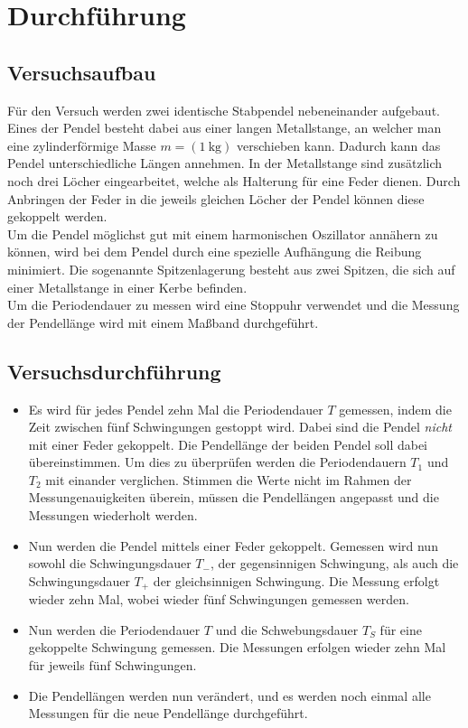 \section{Durchführung}
\label{sec:Durchführung}
\subsection{Versuchsaufbau}
Für den Versuch werden zwei identische Stabpendel nebeneinander aufgebaut. Eines der Pendel besteht dabei aus einer langen Metallstange, an welcher man eine
zylinderförmige Masse $m=(\SI{1}{\kilo\gram})$ verschieben kann. Dadurch kann das Pendel unterschiedliche Längen annehmen. In der Metallstange sind zusätzlich
noch drei Löcher eingearbeitet, welche als Halterung für eine Feder dienen. Durch Anbringen der Feder in die jeweils gleichen Löcher der Pendel können diese
gekoppelt werden.
\\
Um die Pendel möglichst gut mit einem harmonischen Oszillator annähern zu können, wird bei dem Pendel durch eine spezielle Aufhängung die Reibung minimiert. 
Die sogenannte Spitzenlagerung besteht aus zwei Spitzen, die sich auf einer Metallstange in einer Kerbe befinden. 
\\
Um die Periodendauer zu messen wird eine Stoppuhr verwendet und die Messung der Pendellänge wird mit einem Maßband durchgeführt.
\subsection{Versuchsdurchführung}
\begin{itemize}
    \item Es wird für jedes Pendel zehn Mal die Periodendauer $T$ gemessen, indem die Zeit zwischen fünf Schwingungen gestoppt wird. Dabei sind die Pendel 
        \textit{nicht} mit einer Feder gekoppelt. Die Pendellänge der beiden Pendel soll dabei übereinstimmen. Um dies zu überprüfen werden die Periodendauern 
        $T_1$ und $T_2$ mit einander verglichen. Stimmen die Werte nicht im Rahmen der Messungenauigkeiten überein, müssen die Pendellängen angepasst und die 
        Messungen wiederholt werden. 
    \item Nun werden die Pendel mittels einer Feder gekoppelt. Gemessen wird nun sowohl die Schwingungsdauer $T_-$, der gegensinnigen Schwingung, als auch die 
        Schwingungsdauer $T_+$ der gleichsinnigen Schwingung. Die Messung erfolgt wieder zehn Mal, wobei wieder fünf Schwingungen gemessen werden. 
    \item Nun werden die Periodendauer $T$ und die Schwebungsdauer $T_S$ für eine gekoppelte Schwingung gemessen. Die Messungen erfolgen wieder zehn Mal für 
        jeweils fünf Schwingungen.
    \item Die Pendellängen werden nun verändert, und es werden noch einmal alle Messungen für die neue Pendellänge durchgeführt.
\end{itemize}
